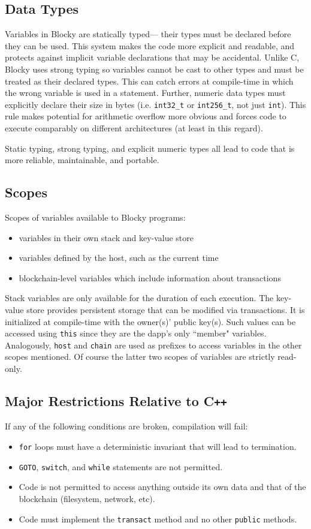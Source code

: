 \documentclass[letterpaper]{article}
\begin{document}
\subsection{Data Types}
Variables in Blocky are statically typed--- their types must be declared before they can be used. This system makes the code more explicit and readable, and protects against implicit variable declarations that may be accidental. Unlike C, Blocky uses strong typing so variables cannot be cast to other types and must be treated as their declared types. This can catch errors at compile-time in which the wrong variable is used in a statement. Further, numeric data types must explicitly declare their size in bytes (i.e. \texttt{int32\_t} or \texttt{int256\_t}, not just \texttt{int}). This rule makes potential for arithmetic overflow more obvious and forces code to execute comparably on different architectures (at least in this regard).

Static typing, strong typing, and explicit numeric types all lead to code that is more reliable, maintainable, and portable. 

\subsection{Scopes}
Scopes of variables available to Blocky programs:
\begin{itemize}
  \item{variables in their own stack and key-value store}
  \item{variables defined by the host, such as the current time}
  \item{blockchain-level variables which include information about transactions}
\end{itemize}
Stack variables are only available for the duration of each execution. The key-value store provides persistent storage that can be modified via transactions. It is initialized at compile-time with the owner(s)' public key(s). Such values can be accessed using \texttt{this} since they are the dapp's only ``member" variables. Analogously, \texttt{host} and \texttt{chain} are used as prefixes to access variables in the other scopes mentioned. Of course the latter two scopes of variables are strictly read-only.

\subsection{Major Restrictions Relative to C\texttt{++}}
If any of the following conditions are broken, compilation will fail:
\begin{itemize}
  \item{\texttt{for} loops must have a deterministic invariant that will lead to termination.}
  \item{\texttt{GOTO}, \texttt{switch}, and \texttt{while} statements are not permitted.}
  \item{Code is not permitted to access anything outside its own data and that of the blockchain (filesystem, network, etc).}
  \item{Code must implement the \texttt{transact} method and no other \texttt{public} methods.}
\end{itemize}
\end{document}
